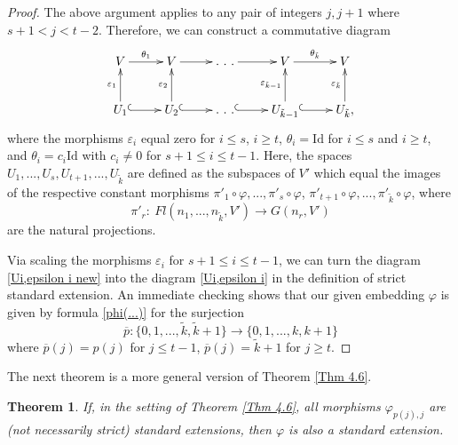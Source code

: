 \documentclass[12pt]{amsart}
\renewcommand{\phi}{\varphi}
\newtheorem{theorem}{Theorem}[section]
\theoremstyle{definition}
\begin{document}
\begin{proof}
The above argument applies to any pair of integers $j,j+1$ 
where $s+1<j<t-2$. Therefore, we can construct a commutative 
diagram
\begin{equation}\label{Ui,epsilon i new}
\xymatrix{
V \ar[r]^-{\theta_1} & V \ar[r] & .\ .\ .\ar[r] &
V \ar[r]^-{\theta_{\tilde{k}}}  & V\\
U_1\ar[u]^-{\varepsilon_1}\ar@{^{(}->}[r] & 
U_2\ar[u]^-{\varepsilon_2}\ar@{^{(}->}[r] & .\ .\ .
\ar@{^{(}->}[r] & U_{\tilde{k}-1}\ar[u]^-{\varepsilon_{\tilde{k}-1}}\ar@{^{(}->}
[r] & U_{\tilde{k}} \ar[u]^-{\varepsilon_{\tilde{k}}} ,} 
\end{equation}
where the morphisms $\varepsilon_i$ equal zero for $i\le s$,
$i\ge t$, $\theta_i=\mathrm{Id}$ for $i\le s$ and $i\ge t$, 
and $\theta_i=c_i\mathrm{Id}$ with $c_i\ne0$ for $s+1\le i\le 
t-1$. Here, the spaces $U_1,...,U_s,U_{t+1},...,U_{\tilde{k}}$
are defined as the subspaces of $V'$ which equal the images of
the respective constant morphisms $\pi'_1\circ\phi,..., \pi'_s
\circ\phi$, $\pi'_{t+1}\circ\phi,...,\pi'_{\tilde{k}}
\circ\phi$, where 
$$
\pi'_r: \ Fl(n_1,...,n_{\tilde{k}},V')\to G(n_r,V')
$$
are the natural projections.

Via scaling the morphisms $\varepsilon_i$ for $s+1\le i
\le t-1$, we can turn the diagram \eqref{Ui,epsilon i new} 
into the diagram \eqref{Ui,epsilon i} in the definition of 
strict standard extension. An immediate checking shows that our 
given embedding $\phi$ is given by formula \eqref{phi(...)} for the
surjection 
$$\overline{p}:\{0,1,...,\tilde{k},\tilde{k}+1\}\to
\{0,1,...,k,k+1\}$$ 
where $\overline{p}(j)=p(j)$ for $j\le 
t-1$, $\overline{p}(j)=\tilde{k}+1$ for $j\ge t$.
\end{proof}

The next theorem is a more general version of Theorem \ref{Thm 
4.6}.

\begin{theorem}\label{Thm 4.3}
If, in the setting of Theorem \ref{Thm 4.6}, all morphisms 
$\phi_{p(j),j}$ are (not necessarily strict) standard 
extensions, then $\phi$ is also a standard extension.
\end{theorem}
\end{document}
